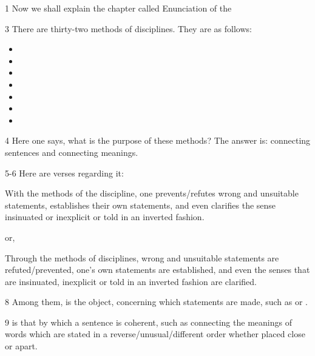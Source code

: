 \begin{translation}
    
    \item [1] Now we shall explain the chapter called Enunciation of the 
    
    \item [3] There are thirty-two methods of disciplines. They are as follows: 
        \begin{itemize}
            \item {}
            \item {}
            \item {}
            \item {}
            \item {}
            \item {}
            \item {}
        \end{itemize}
    
    \item [4] Here one says, what is the purpose of these methods? The answer is: connecting sentences and connecting meanings.
    
    \item [5-6] Here are verses regarding it:
    
    With the methods of the discipline, one prevents/refutes wrong and unsuitable statements, establishes their own statements, and even clarifies the sense insinuated or inexplicit or told in an inverted fashion. 
     
     or,
     
    Through the methods of disciplines, wrong and unsuitable statements are refuted/prevented, one’s own statements are established, and even the senses that are insinuated, inexplicit or told in an inverted fashion are clarified. 
    
    \item [8] Among them,  is the object, concerning which statements are made, such as  or . 
    
    \item [9]  is that by which a sentence is coherent, such as connecting the meanings of words which are stated in a reverse/unusual/different order whether placed close or apart.
    

\end{translation}
